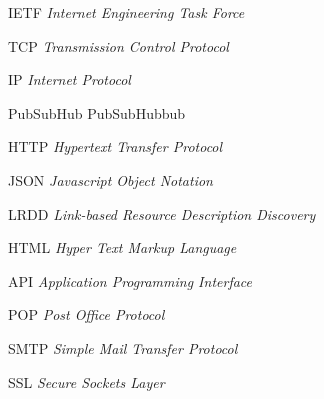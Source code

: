 \begin{siglas}
  \item[IETF] \textit{Internet Engineering Task Force}
  \item[TCP] \textit{Transmission Control Protocol}
  \item[IP] \textit{Internet Protocol}
  \item[PubSubHub] PubSubHubbub
  \item[HTTP] \textit{Hypertext Transfer Protocol}
  \item[JSON] \textit{Javascript Object Notation}
  \item[LRDD] \textit{Link-based Resource Description Discovery}
  \item[HTML] \textit{Hyper Text Markup Language}
  \item[API] \textit{Application Programming Interface}
  \item[POP] \textit{Post Office Protocol}
  \item[SMTP] \textit{Simple Mail Transfer Protocol}
  \item[SSL] \textit{Secure Sockets Layer}
\end{siglas}
